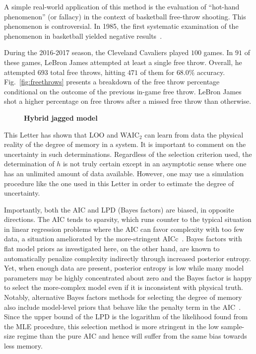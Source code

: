 \documentclass[prl,twocolumn,groupedaddress]{revtex4-1}
\begin{document}
A simple real-world application of this method is the evaluation of ``hot-hand phenomenon'' (or fallacy) in the context of basketball free-throw shooting. This phenomenon is controversial. In 1985, the first systematic examination of the phenomenon in basketball yielded negative results~\cite{gilovich1985hot}.

  During the 2016-2017 season, the Cleveland Cavaliers played $100$ games. In $91$ of these games, LeBron James attempted at least a single free throw. Overall, he attempted $693$ total free throws, hitting $471$ of them for $68.0\%$ accuracy. Fig.~\ref{fig:freethrows} presents a breakdown of the free throw percentage conditional on the outcome of the previous in-game free throw. LeBron James shot a higher percentage on free throws after a missed free throw than otherwise.
  
  \cite{burns2001hot}\cite{miller2016surprised}\cite{bocskocsky2014hot}\cite{arkes2010revisiting}


\begin{figure}
\caption{\textbf{Hybrid jagged model}} 
\label{fig:fig5}
\end{figure}

This Letter has shown that LOO and WAIC$_2$ can learn from data the physical reality of the 
degree of memory in a system. It is important to comment on the uncertainty in such determinations. Regardless of the selection criterion used, the determination of $h$ is not truly certain except in an asymptotic sense where one has an unlimited amount of data available. However, one may use a simulation procedure like the one used in this Letter in order to estimate the degree of uncertainty.  

Importantly,   both the AIC and LPD (Bayes factors) are biased, in opposite directions. The AIC tends to sparsity, which runs counter to the typical situation in linear regression problems where the AIC can favor complexity with too few data, a situation ameliorated by the more-stringent AICc~\cite{claeskens2008model}. Bayes factors with flat model  priors as investigated here, on the other hand, are known to automatically penalize complexity indirectly through increased posterior entropy. Yet, when enough data are present, posterior entropy is low while many model parameters may be highly concentrated about zero and the Bayes factor is happy to select the more-complex model even if it is inconsistent with physical truth.
%
Notably, alternative Bayes factors methods for selecting the degree of memory also include model-level priors that behave like the penalty term in the AIC~\cite{strelioff2007inferring,singer2014detecting}. Since the upper bound of the LPD is the logarithm of the likelihood found from the MLE procedure, this selection method is more stringent in the low sample-size regime than the pure AIC and hence will suffer from the same bias towards less memory.
\end{document}
